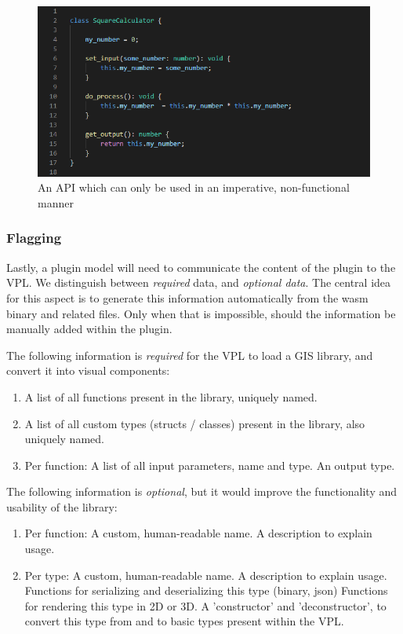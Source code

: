 \begin{figure}
  \centering
  \graphicspath{ {../../assets/images/6/3/} }
  \includegraphics[width=\linewidth]{ugly-oop.png}
  \caption[]{An API which can only be used in an imperative, non-functional manner}
  \label{fig:oop-considered-harmful}
\end{figure}

\subsubsection{Flagging}

Lastly, a plugin model will need to communicate the content of the plugin to the VPL. 
We distinguish between \emph{required} data, and \emph{optional data}.
The central idea for this aspect is to generate this information automatically from the wasm binary and related files.
Only when that is impossible, should the information be manually added within the plugin.

The following information is \emph{required} for the VPL to load a GIS library, and convert it into visual components:

\begin{enumerate}[-]
  \item A list of all functions present in the library, uniquely named.
  \item A list of all custom types (structs / classes) present in the library, also uniquely named.
  \item Per function:  
  \subitem A list of all input parameters, name and type.
  \subitem An output type.
\end{enumerate}

The following information is \emph{optional}, but it would improve the functionality and usability of the library:
\begin{enumerate}[-]
  \item Per function:
  \subitem A custom, human-readable name.
  \subitem A description to explain usage.

  \item Per type:
  \subitem A custom, human-readable name.
  \subitem A description to explain usage.
  \subitem Functions for serializing and deserializing this type (binary, json)  
  \subitem Functions for rendering this type in 2D or 3D.
  \subitem A 'constructor' and 'deconstructor', to convert this type from and to basic types present within the VPL.  
\end{enumerate}

